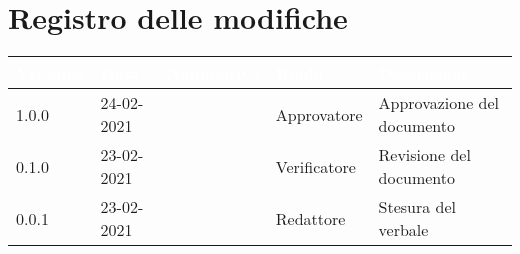 \section*{Registro delle modifiche}
{
\setcounter{table}{-1}
{
\renewcommand{\arraystretch}{1.5}
\centering
\begin{longtable}{C{1.7cm} C{2.5cm} C{3.2cm} C{2.7cm} C{4.8cm}}
\textcolor{white}{\textbf{Versione}}&
\textcolor{white}{\textbf{Data}}&
\textcolor{white}{\textbf{Nominativo}}&
\textcolor{white}{\textbf{Ruolo}}&
\textcolor{white}{\textbf{Descrizione}}\\	
\endhead

1.0.0 & 24-02-2021 & \Approvatore{} & Approvatore & Approvazione del documento\\	
0.1.0 & 23-02-2021 & \Verificatori{} & Verificatore & Revisione del documento\\		
0.0.1 & 23-02-2021 & \ZM{} & Redattore & Stesura del verbale\\
		
\end{longtable}
}
}
